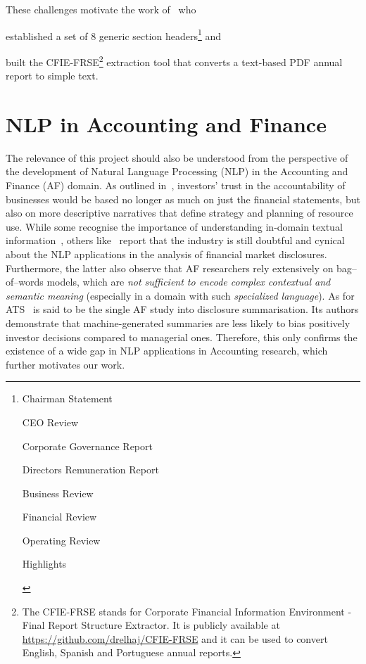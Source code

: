 These challenges motivate the work of~\cite{elhaj2019multilingual} who \begin{enumerate*}[label=(\alph*)]
    \item established a set of 8 generic section headers\footnote{
        \begin{enumerate*}
            \item Chairman Statement
            \item CEO Review
            \item Corporate Governance Report
            \item Directors Remuneration Report
            \item Business Review
            \item Financial Review
            \item Operating Review
            \item Highlights
        \end{enumerate*}
    } and
    \item built the CFIE-FRSE\footnote{
        The CFIE-FRSE stands for Corporate Financial Information Environment - Final Report Structure Extractor.
        It is publicly available at \url{https://github.com/drelhaj/CFIE-FRSE} and it can be used to convert English, Spanish and Portuguese annual reports.
    } extraction tool that converts a text-based PDF annual report to simple text.
\end{enumerate*}

\section{NLP in Accounting and Finance}\label{sec:nlp-in-accounting-and-finance}
The relevance of this project should also be understood from the perspective of the development of Natural Language Processing (NLP) in the Accounting and Finance (AF) domain.
As outlined in~\cite{elliott1998accounting}, investors' trust in the accountability of businesses would be based no longer as much on just the financial statements, but also on more descriptive narratives that define strategy and planning of resource use.
While some recognise the importance of understanding in-domain textual information~\cite{li2010textual}, others like~\cite{el-haj2019meaning} report that the industry is still doubtful and cynical about the NLP applications in the analysis of financial market disclosures.
Furthermore, the latter also observe that AF researchers rely extensively on bag--of--words models, which are \emph{not sufficient to encode complex contextual and semantic meaning} (especially in a domain with such \emph{specialized language}).
As for ATS~\cite{hollander-white-af} is said to be the single AF study into disclosure summarisation.
Its authors demonstrate that machine-generated summaries are less likely to bias positively investor decisions compared to managerial ones.
Therefore, this only confirms the existence of a wide gap in NLP applications in Accounting research, which further motivates our work.

